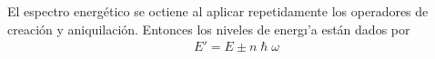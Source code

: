 \documentclass[letterpaper,12pt,oneside]{book}
\begin{document}
% 
% 
El espectro energ\'etico se octiene al aplicar repetidamente los operadores de creaci\'on y aniquilaci\'on. Entonces los niveles de energ\i'a est\'an dados por
\begin{eqnarray}
E'=E\pm n\hslash \omega
\end{eqnarray}
\end{document}
